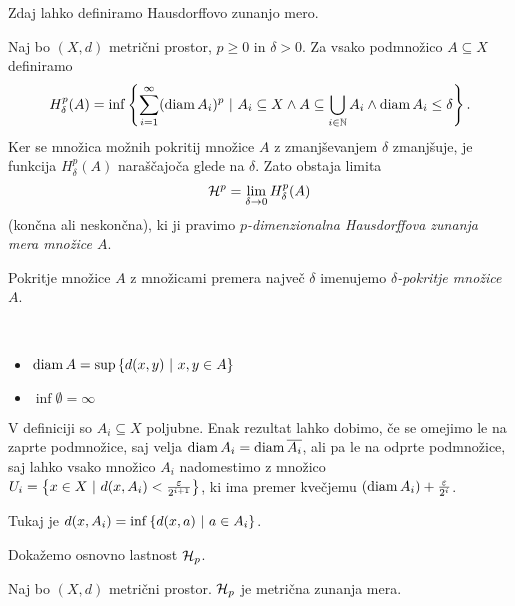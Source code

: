 Zdaj lahko definiramo Hausdorffovo zunanjo mero.
\begin{definicija}
    \label{def-haus-mera}
    Naj bo \((X, d)\) metrični prostor, \(p \geq 0\) in \(\delta > 0\). Za vsako podmnožico \(A \subseteq X\) definiramo 
    \[H^p_\delta(A) = \inf \left\{\sum_{i=1}^{\infty}(\operatorname{diam} A_i)^p \ | \ A_i \subseteq X \land A \subseteq \bigcup_{i \in \mathbb{N}} A_i \land \operatorname{diam} A_i \leq \delta\right\}.\]
    Ker se množica možnih pokritij množice \(A\) z zmanjševanjem \(\delta\) zmanjšuje, je funkcija \(H^p_\delta(A)\) naraščajoča glede na \(\delta\). Zato obstaja limita
    \[\mathcal{H}^p = \lim_{\delta \to 0} H_\delta^p(A)\]
    (končna ali neskončna), ki ji pravimo \emph{\(p\)-dimenzionalna Hausdorffova zunanja mera množice \(A\)}.

    Pokritje množice \(A\) z množicami premera največ \(\delta\) imenujemo \emph{\(\delta\)-pokritje množice \(A\)}.
\end{definicija}

\begin{opomba} \ 
    \begin{itemize}
        \item \(\operatorname{diam} A = \sup \left\{d(x, y) \ | \ x, y \in A\right\}\)
        \item \(\inf \emptyset = \infty\)
    \end{itemize}
\end{opomba}

\begin{opomba}
    \label{odp-zap-haus}
    V definiciji so \(A_i \subseteq X\) poljubne. Enak rezultat lahko dobimo, če se omejimo le na zaprte podmnožice, saj velja \(\operatorname{diam} A_i = \operatorname{diam} \overline{A_i}\), ali pa le na odprte podmnožice, saj lahko vsako množico \(A_i\) nadomestimo z množico \(U_i = \left\{x \in X \ | \ d(x, A_i) < \frac{\varepsilon}{2^{i+1}}\right\}\), ki ima premer kvečjemu \((\operatorname{diam} A_i) + \frac{\varepsilon}{2^i}\).

    Tukaj je \(d(x, A_i) = \inf \left\{d(x, a) \ | \ a \in A_i\right\}\).
\end{opomba}

Dokažemo osnovno lastnost \(\mathcal{H}_p\).
\begin{trditev}
    \label{haus-m-zun}
    Naj bo \((X, d)\) metrični prostor. \(\mathcal{H}_p\) je metrična zunanja mera.
\end{trditev}

